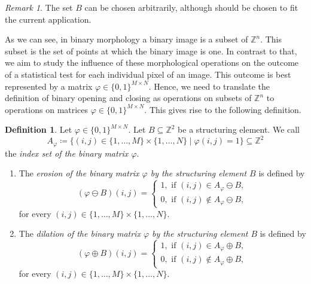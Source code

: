 \documentclass[a4paper,12pt]{article}
\theoremstyle{plain}
\theoremstyle{definition}
\newtheorem{definition}[theorem]{Definition}
\theoremstyle{remark}
\newtheorem{remark}[theorem]{Remark}
\begin{document}
\begin{remark}
	The set $B$ can be chosen arbitrarily, although should be chosen to fit the current application.
\end{remark}

As we can see, in binary morphology a binary image is a subset of $\mathbb{Z}^n$. This subset is the set of points at which the binary image is one. In contrast to that, we aim to study the influence of these morphological operations on the outcome of a statistical test for each individual pixel of an image. This outcome is best represented by a matrix $\varphi \in \{ 0, 1 \}^{M \times N}$. Hence, we need to translate the definition of binary opening and closing as operations on subsets of $\mathbb{Z}^n$ to operations on matrices $\varphi \in \{ 0, 1 \}^{M \times N}$. This gives rise to the following definition.

\begin{definition}
	Let $\varphi \in \{ 0, 1 \}^{M \times N}$. Let $B \subseteq \mathbb{Z}^2$ be a structuring element. We call
	\begin{equation*}
		A_\varphi \coloneqq \{ (i, j) \in \{ 1, \dots, M \} \times \{ 1, \dots, N \} \mid \varphi(i, j) = 1 \} \subseteq \mathbb{Z}^2
	\end{equation*}
	the \emph{index set of the binary matrix $\varphi$}.
	\begin{enumerate}
		\item The \emph{erosion of the binary matrix $\varphi$ by the structuring element $B$} is defined by
		\begin{equation}
			(\varphi \ominus B)(i, j) =
			\begin{cases}
				1, \textrm{ if } (i, j) \in A_\varphi \ominus B, \\
				0, \textrm{ if } (i, j) \notin A_\varphi \ominus B,
			\end{cases}
		\end{equation}
		for every $(i, j) \in \{ 1, \dots, M \} \times \{ 1, \dots, N \}$.
		\item The \emph{dilation of the binary matrix $\varphi$ by the structuring element $B$} is defined by
		\begin{equation}
			(\varphi \oplus B)(i, j) =
			\begin{cases}
				1, \textrm{ if } (i, j) \in A_\varphi \oplus B, \\
				0, \textrm{ if } (i, j) \notin A_\varphi \oplus B,
			\end{cases}
		\end{equation}
		for every $(i, j) \in \{ 1, \dots, M \} \times \{ 1, \dots, N \}$.
	\end{enumerate}
\end{definition}
\end{document}
